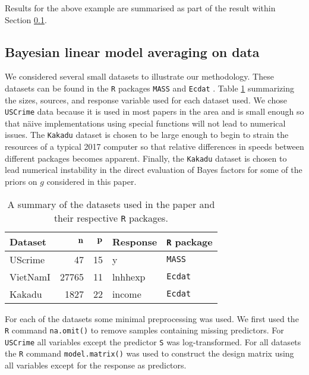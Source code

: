 \documentclass[12pt]{article}
\def\vectorfontone{\bf}
\def\vn{{\vectorfontone n}}                      %
\def\vp{{\vectorfontone p}}                      %
\begin{document}
\noindent Results for the above example are summarised as part of the result within Section 
\ref{sec:BLMA}.

\subsection{Bayesian linear model averaging on data}\label{sec:BLMA}

We considered several small datasets to illustrate our methodology. These datasets
can be found in the {\tt R} packages {\tt MASS} \citep{Venables2002} and 
{\tt Ecdat} \citep{Croissant2016}. Table \ref{tab:datasets} summarizing the sizes,  
sources, and response variable used for each dataset used. 
We chose {\tt USCrime} data because it is used in most papers in
the area and is small enough so that n\"aive implementations using special functions will
not lead to numerical issues. The 
 {\tt Kakadu} dataset is chosen to
be large enough to begin to strain the resources of a typical 2017 computer so that
relative differences in speeds between different packages becomes apparent. Finally, the
{\tt Kakadu} dataset is chosen to lead numerical instability in the direct evaluation of Bayes
factors for some of the priors on $g$ considered in this paper.

\begin{table}[h]
	\begin{center}
\begin{tabular}{l|r|r|l|l}
{\bf Dataset}	& $\vn$ & $\vp$ & Response & {\bf {\tt R} package} \\ 
	\hline 
UScrime 	& 47 & 15 & y & {\tt MASS} \\  
VietNamI	& 27765 & 11 & lnhhexp & {\tt Ecdat}  \\ 
Kakadu	& 1827 & 22 & income & {\tt Ecdat}   \\  
\end{tabular} 
	\end{center}
\caption{A summary of the datasets used in the paper and their respective {\tt R} packages.}
\label{tab:datasets}
\end{table}
 
For each of the datasets some minimal preprocessing was used.
We first used the {\tt R} command {\tt na.omit()} to remove samples containing missing predictors. 
For {\tt USCrime} all variables except the predictor {\tt S} was log-transformed. For all datasets
the {\tt R} command {\tt model.matrix()} was used to construct the design matrix using all 
variables except for the response as predictors.
\end{document}
